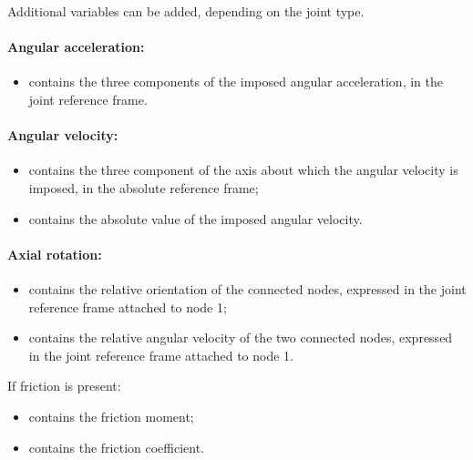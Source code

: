 Additional variables can be added, depending on the joint type. 

\paragraph{Angular acceleration:}
\begin{itemize}
\item {} contains the three components of the imposed
  angular acceleration, in the joint reference frame.
\end{itemize}

\paragraph{Angular velocity:}
\begin{itemize}
\item {} contains the three component of the axis about
  which the angular velocity is imposed, in the absolute reference frame;
\item {} contains the absolute value of the imposed
  angular velocity.
\end{itemize}

\paragraph{Axial rotation:}
\begin{itemize}
\item {} contains the relative orientation of the
  connected nodes, expressed in the joint reference frame attached to node 1;
\item {} contains the relative angular velocity
  of the two connected nodes, expressed in the joint reference frame attached to node 1.
\end{itemize}
If friction is present:
\begin{itemize}
\item {} contains the friction moment;
\item {} contains the friction coefficient.
\end{itemize}

